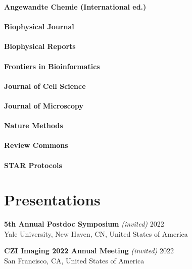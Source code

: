 \documentclass[margin,line]{res}
\begin{document}
\begin{resume}
{\bf   Angewandte Chemie (International ed.)} \\
\vspace*{-3mm}\\
{\bf   Biophysical Journal}\\
\vspace*{-3mm}\\
{\bf   Biophysical Reports}\\
\vspace*{-3mm}\\
{\bf   Frontiers in Bioinformatics }\\
\vspace*{-3mm}\\
{\bf   Journal of Cell Science}\\
\vspace*{-3mm}\\
{\bf  Journal of Microscopy}\\
\vspace*{-3mm}\\
{\bf    Nature Methods}\\
\vspace*{-3mm}\\
{\bf    Review Commons}\\
\vspace*{-3mm}\\
{\bf    STAR Protocols}\\


\section{\sc  Presentations}

{\bf  5th Annual Postdoc Symposium}  {\it (invited)} \hfill 2022\\
Yale University, New Haven, CN, United States of America %

\vspace*{-2.5mm}
{\bf  CZI Imaging 2022 Annual Meeting}  {\it (invited)} \hfill 2022\\
San Francisco, CA, United States of America %


\end{resume}
\end{document}
